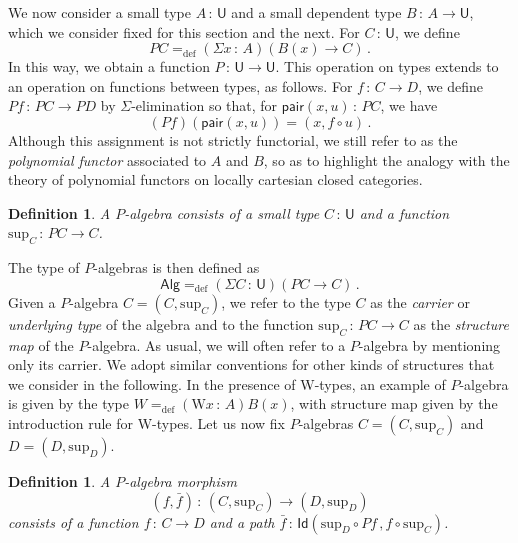 \documentclass[10pt,a4paper,oneside,reqno]{amsart}
\numberwithin{equation}{section}
\theoremstyle{mythm}
\theoremstyle{mydef}
\newtheorem{definition}[theorem]{Definition}
\theoremstyle{myrmk}
\newcommand{\defeq}{=_{\mathrm{def}}}
\newcommand{\co}{\,{:}\,}
\newcommand{\Id}{\mathsf{Id}}
\newcommand{\pair}{\mathsf{pair}}
\newcommand{\W}{\mathrm{W}}
\newcommand{\U}{\mathsf{U}}
\newcommand{\Palg}{\mathsf{Alg}}
\renewcommand{\sup}{\mathrm{sup}}
\begin{document}
We now consider a small type $A \co \U$ and a small dependent type $B \co A \to \U$, which we consider
fixed for this section and the next. For $C \co \U$,
we define
\[
PC \defeq (\Sigma x \co A) (B(x) \to C) \, .
\]
In this way, we obtain a function $P \co \U \to \U$. This operation on types extends to an operation on functions between 
 types, as follows. For $f \co C \to D$, we define $P f  \co PC \to PD$ by $\Sigma$-elimination
so that, for $\pair(x, u) \co PC$, we have 
\[
(Pf )( \pair(x, u)) = (x,f\circ u) \, .
\] 
Although this assignment is not strictly functorial, we still refer to  as the \emph{polynomial functor} associated to $A$ and $B$, so as to highlight the analogy with the theory of polynomial functors on locally cartesian closed categories.

\begin{definition} A \emph{$P$-algebra} consists of a small type $C \co \U$ and a function $\sup_C \co PC \to C$. 
\end{definition}

\smallskip

 The type of $P$-algebras is then defined as 
 \[
 \Palg  \defeq (\Sigma C \co \U) (PC \to C) \, .
 \]
 Given a $P$-algebra $C = (C, \sup_C)$,
 we refer to the type $C$ as the \emph{carrier} or \emph{underlying type} of the algebra and to the function $\sup_C \co PC\to C$ as the \emph{structure map} of the $P$-algebra. 
 As usual,  we will often refer to a 
 $P$-algebra by mentioning only its carrier. We adopt similar conventions for other kinds of structures that we consider
 in the following.  In the
 presence of W-types, an example of $P$-algebra is given by the type $W \defeq (\W x\co A)B(x)$, with structure map given by the introduction rule for W-types. 
Let us now fix $P$-algebras $C = (C, \sup_C)$ and $D = (D, \sup_D)$. 

\begin{definition} A \emph{$P$-algebra morphism}
\[
(f, \bar{f}) \co (C, \sup_C) \rightarrow (D, \sup_D)
\]
consists of a function $f \co C \rightarrow D$ and a path $\bar{f} \co \Id(\sup_{D} \circ P f \, ,  f \circ \sup_C)$.
\end{definition}
\end{document}
